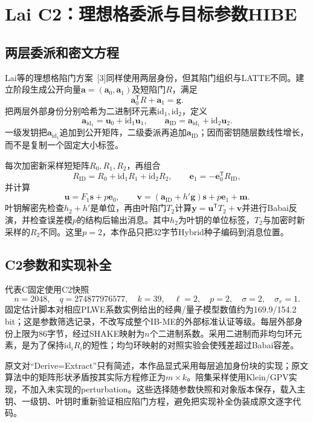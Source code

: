 \documentclass[UTF8,a4paper,12pt,oneside,openany,fontset=fandol]{ctexrep}
\begin{document}
\section{Lai C2：理想格委派与目标参数HIBE}
\subsection{两层委派和密文方程}
Lai等的理想格陷门方案~[3]同样使用两层身份，但其陷门组织与LATTE不同。建立阶段生成公开向量$\mathbf a=(\mathbf a_0,\mathbf a_1)$及短陷门$R$，满足
\[
  \mathbf a_0^{\mathsf T}R+\mathbf a_1=\mathbf g.
\]
把两层外部身份分别哈希为二进制环元素$\mathrm{id}_1,\mathrm{id}_2$，定义
\[
  \mathbf a_{\mathrm{id}_1}=\mathbf u_0+\mathrm{id}_1\mathbf u_1,
  \qquad
  \mathbf a_{\mathrm{ID}}=\mathbf a_{\mathrm{id}_1}+\mathrm{id}_2\mathbf u_2.
\]
一级发钥把$\mathbf a_{\mathrm{id}_1}$追加到公开矩阵，二级委派再追加$\mathbf a_{\mathrm{ID}}$；因而密钥随层数线性增长，而不是复制一个固定大小标签。

每次加密新采样短矩阵$R_0,R_1,R_2$，再组合
\[
  R_{\mathrm{ID}}=R_0+\mathrm{id}_1R_1+\mathrm{id}_2R_2,
  \qquad \mathbf e_1=-\mathbf e_0^{\mathsf T}R_{\mathrm{ID}},
\]
并计算
\[
  \mathbf u=F_1\mathbf s+p\mathbf e_0,
  \qquad
  \mathbf v=(\mathbf a_{\mathrm{ID}}+h'\mathbf g)\mathbf s
           +p\mathbf e_1+\mathbf m.
\]
叶钥解密先检查$h_2+h'$是单位，再由叶陷门$T_2$计算$\mathbf y=\mathbf u^{\mathsf T}T_2+\mathbf v$并进行Babai反演，并检查误差模$p$的结构后输出消息。其中$h_2$为叶钥的单位标签，$T_2$与加密时新采样的$R_2$不同。这里$p=2$，本作品只把32字节Hybrid种子编码到消息位置。

\subsection{C2参数和实现补全}
代表C固定使用C2快照
\[
  n=2048,\quad q=274877976577,\quad k=39,\quad
  \ell=2,\quad p=2,\quad \sigma=2,\quad \sigma_r=1.
\]
固定估计脚本对相应PLWE系数实例给出的经典/量子模型数值约为169.9/154.2 bit；这是参数筛选记录，不改写成整个IB-ME的外部标准认证等级。每层外部身份上限为86字节，经过SHAKE映射为$n$个二进制系数。采用二进制而非均匀环元素，是为了保持$\mathrm{id}_iR_i$的短性；均匀环映射的对照实验会使残差超过Babai容差。

原文对“Derive=Extract”只有简述，本作品显式采用每层追加身份块的实现；原文算法中的矩阵形状矛盾按其实际方程修正为$m\times k$。陪集采样使用Klein/GPV实现，不加入未实现的perturbation。这些选择随参数快照和对象版本保存，载入主钥、一级钥、叶钥时重新验证相应陷门方程，避免把实现补全伪装成原文逐字代码。
\end{document}

